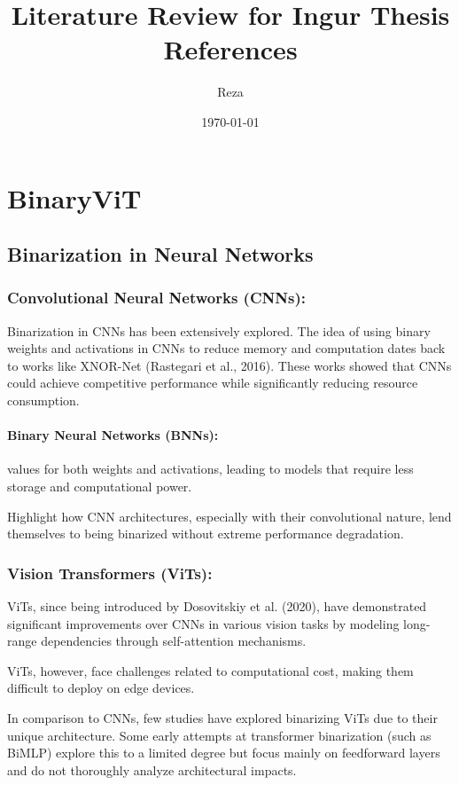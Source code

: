 \documentclass{report}
\title{Literature Review for Ingur Thesis References}
\author{Reza}
\date{\today}
\begin{document}
	
	\maketitle
	
	\chapter*{BinaryViT \cite{le2023binaryvit}}
	
	\section{Binarization in Neural Networks}
	
	\subsection{Convolutional Neural Networks (CNNs):}
	Binarization in CNNs has been extensively explored. The idea of using binary weights and activations in CNNs to reduce memory and computation dates back to works like XNOR-Net (Rastegari et al., 2016). These works showed that CNNs could achieve competitive performance while significantly reducing resource consumption.
	
	\subsubsection{Binary Neural Networks (BNNs):}
	values for both weights and activations, leading to models that require less storage and computational power.
	
	Highlight how CNN architectures, especially with their convolutional nature, lend themselves to being binarized without extreme performance degradation.
	
	\subsection{Vision Transformers (ViTs):}
	ViTs, since being introduced by Dosovitskiy et al. (2020), have demonstrated significant improvements over CNNs in various vision tasks by modeling long-range dependencies through self-attention mechanisms.
	
	ViTs, however, face challenges related to computational cost, making them difficult to deploy on edge devices.
	
	In comparison to CNNs, few studies have explored binarizing ViTs due to their unique architecture. Some early attempts at transformer binarization (such as BiMLP) explore this to a limited degree but focus mainly on feedforward layers and do not thoroughly analyze architectural impacts.
	
\end{document}
